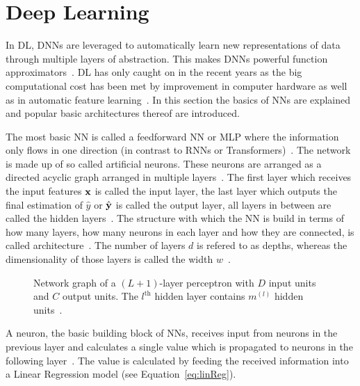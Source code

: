 \section{Deep Learning}
In \ac{DL}, \acp{DNN} are leveraged to automatically learn new representations of data through
multiple layers of abstraction.
This makes \acp{DNN} powerful function approximators~\citep{goodfellow_deep_2016}.
\ac{DL} has only caught on in the recent years as the big computational cost has been met
by improvement in computer hardware as well as in automatic feature
learning~\citep{ponti_everything_2017, chen_text_2021}.
In this section the basics of \acp{NN} are explained and popular basic architectures thereof are
introduced.

The most basic \ac{NN} is called a feedforward \ac{NN} or \ac{MLP} where the information only
flows in one direction (in contrast to \acp{RNN} or Transformers)~\citep{goodfellow_deep_2016}.
The network is made up of so called artificial neurons.
These neurons are arranged as a directed acyclic graph arranged in multiple
layers~\citep{goodfellow_deep_2016}.
The first layer which receives the input features $\textbf{x}$ is called the input layer, the last layer
which outputs the final estimation of $\hat{y}$ or $\hat{\textbf{y}}$ is called the output layer, all layers in between
are called the hidden layers~\citep{shrestha_review_2019}.
The structure with which the \ac{NN} is build in terms of how many layers, how many neurons in each
layer and how they are connected, is called architecture~\citep{goodfellow_deep_2016}.
The number of layers $d$ is refered to as depths, whereas the dimensionality of those layers is
called the width $w$~\citep{goodfellow_deep_2016}.
\begin{figure}[ht]
	\centering
    
	\caption[Network graph for a MLP]{%
        Network graph of a $(L+1)$-layer perceptron with $D$ input units and $C$ output units.
        The $l^{\text{th}}$ hidden layer contains $m^{(l)}$ hidden
        units~\citep{chauhan_review_2018,goodfellow_deep_2016}.\label{fig:multilayer-perceptron}
    }
\end{figure}
A neuron, the basic building block of \acp{NN}, receives input from neurons in the previous layer
and calculates a single value which is propagated to neurons in the following
layer~\citep{shrestha_review_2019}.
The value is calculated by feeding the received information into a Linear Regression model (see
Equation~\ref{eq:linReg}).
